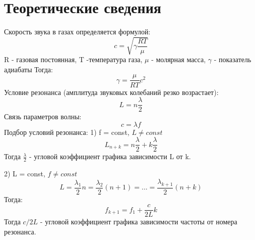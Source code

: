 \documentclass[a4paper, 12pt]{article}
\begin{document}
	\section{Теоретические сведения}
	Скорость звука в газах определяется формулой:
	\begin{equation}
		c = \sqrt{\gamma \frac{RT}{\mu}}
	\end{equation}
	R - газовая постоянная, T -температура газа, $\mu$ - молярная масса, $\gamma$ - показатель адиабаты
	Тогда:
	\begin{equation}
		\gamma = \frac{\mu}{RT}c^2
	\end{equation} 
	Условие резонанса (амплитуда звуковых колебаний резко возрастает):
	\begin{equation}
		L = n\frac{\lambda}{2}
	\end{equation}
	Связь параметров волны:
	\begin{equation}
		c=\lambda f
	\end{equation}
	Подбор условий резонанса:
	1) f = const, $L\neq const$
	\begin{equation}
		L_{n+k} = n\frac{\lambda}{2} + k \frac{\lambda}{2}
	\end{equation}
	Тогда $\frac{\lambda}{2}$ - угловой коэффициент графика зависимости L от k.
	
	2) L = const, $f\neq const$
	\begin{equation}
		L=\frac{\lambda_1}{2}n=\frac{\lambda_2}{2}(n+1)=...=\frac{\lambda_{k+1}}{2}(n+k)
	\end{equation}
	Тогда:
	\begin{equation}
		f_{k+1} = f_1+\frac{c}{2L}k
	\end{equation}
	Тогда $c/2L$ - угловой коэффициент графика зависимости частоты от номера резонанса.
\end{document}
